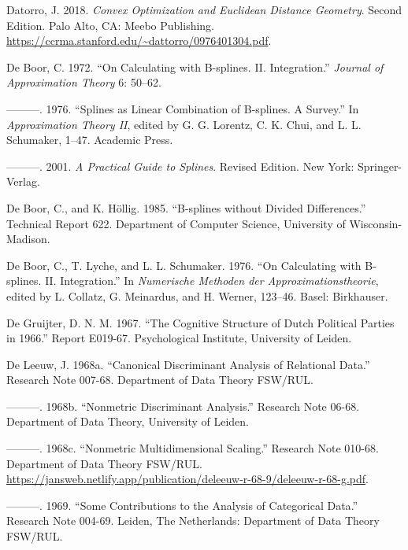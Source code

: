 \documentclass[
  12pt,
  letterpaper,
  DIV=11,
  numbers=noendperiod]{scrreprt}
\newlength{\cslhangindent}
\newenvironment{CSLReferences}[2] %
 {\begin{list}{}{%
  \setlength{\itemindent}{0pt}
  \setlength{\leftmargin}{0pt}
  \setlength{\parsep}{0pt}
  \ifodd #1
   \setlength{\leftmargin}{\cslhangindent}
   \setlength{\itemindent}{-1\cslhangindent}
  \fi
  \setlength{\itemsep}{#2\baselineskip}}}
 {\end{list}}
\theoremstyle{remark}
\begin{document}
\begin{CSLReferences}{1}{0}
Datorro, J. 2018. \emph{Convex Optimization and Euclidean Distance
Geometry}. Second Edition. Palo Alto, CA: Meebo Publishing.
\url{https://ccrma.stanford.edu/~dattorro/0976401304.pdf}.

De Boor, C. 1972. {``{On Calculating with B-splines. II.
Integration}.''} \emph{Journal of Approximation Theory} 6: 50--62.

---------. 1976. {``{Splines as Linear Combination of B-splines. A
Survey.}''} In \emph{{Approximation Theory II}}, edited by G. G.
Lorentz, C. K. Chui, and L. L. Schumaker, 1--47. Academic Press.

---------. 2001. \emph{A Practical Guide to Splines}. Revised Edition.
New York: Springer-Verlag.

De Boor, C., and K. Höllig. 1985. {``{B-splines without Divided
Differences}.''} Technical Report 622. Department of Computer Science,
University of Wisconsin-Madison.

De Boor, C., T. Lyche, and L. L. Schumaker. 1976. {``{On Calculating
with B-splines. II. Integration}.''} In \emph{{Numerische Methoden der
Approximationstheorie}}, edited by L. Collatz, G. Meinardus, and H.
Werner, 123--46. Basel: Birkhauser.

De Gruijter, D. N. M. 1967. {``{The Cognitive Structure of Dutch
Political Parties in 1966}.''} Report E019-67. Psychological Institute,
University of Leiden.

De Leeuw, J. 1968a. {``Canonical Discriminant Analysis of Relational
Data.''} Research Note 007-68. Department of Data Theory FSW/RUL.

---------. 1968b. {``Nonmetric Discriminant Analysis.''} Research Note
06-68. Department of Data Theory, University of Leiden.

---------. 1968c. {``Nonmetric Multidimensional Scaling.''} Research
Note 010-68. Department of Data Theory FSW/RUL.
\url{https://jansweb.netlify.app/publication/deleeuw-r-68-9/deleeuw-r-68-g.pdf}.

---------. 1969. {``{Some Contributions to the Analysis of Categorical
Data}.''} Research Note 004-69. Leiden, The Netherlands: Department of
Data Theory FSW/RUL.


\end{CSLReferences}
\end{document}
